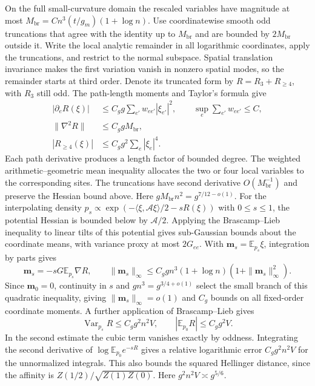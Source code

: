 \documentclass[11pt,a4paper]{article}
\numberwithin{equation}{section}
\begin{document}
On the full small-curvature domain the rescaled variables have magnitude at most \(M_{\mathrm{br}}=C n^3(t/g_m)(1+\log n)\). Use coordinatewise smooth odd truncations that agree with the identity up to \(M_{\mathrm{br}}\) and are bounded by \(2M_{\mathrm{br}}\) outside it. Write the local analytic remainder in all logarithmic coordinates, apply the truncations, and restrict to the normal subspace. Spatial translation invariance makes the first variation vanish in nonzero spatial modes, so the remainder starts at third order. Denote its truncated form by \(R=R_3+R_{\ge4}\), with \(R_3\) still odd. The path-length moments and Taylor's formula give
\begin{equation}
 \begin{split}
 |\partial_eR(\xi)|&\le C_g g\sum_{e'} w_{ee'}|\xi_{e'}|^2,
          \qquad \sup_e\sum_{e'}w_{ee'}\le C,\\
 \|\nabla^2 R\|&\le C_g gM_{\mathrm{br}},\\
 |R_{\ge4}(\xi)|&\le C_g g^2\sum_e|\xi_e|^4 .
 \end{split}                                                     \label{eq:cam-soft-remainder}
\end{equation}
Each path derivative produces a length factor of bounded degree. The weighted arithmetic--geometric mean inequality allocates the two or four local variables to the corresponding sites. The truncations have second derivative \(O(M_{\mathrm{br}}^{-1})\) and preserve the Hessian bound above. Here \(gM_{\mathrm{br}}n^2=g^{7/12-o(1)}\). For the interpolating density \(p_s\propto\exp(-\langle\xi,\mathcal A\xi\rangle/2-sR(\xi))\) with \(0\le s\le1\), the potential Hessian is bounded below by \(\mathcal A/2\). Applying the Brascamp--Lieb inequality to linear tilts of this potential gives sub-Gaussian bounds about the coordinate means, with variance proxy at most \(2G_{ee}\). With \(\mathbf m_s=\mathbb E_{p_s}\xi\), integration by parts gives
\[
 \mathbf m_s=-sG\mathbb E_{p_s}\nabla R,\qquad
 \|\mathbf m_s\|_\infty\le C_g gn^3(1+\log n)(1+\|\mathbf m_s\|_\infty^2).
\]
Since \(\mathbf m_0=0\), continuity in \(s\) and \(gn^3=g^{3/4+o(1)}\) select the small branch of this quadratic inequality, giving \(\|\mathbf m_s\|_\infty=o(1)\) and \(C_g\) bounds on all fixed-order coordinate moments. A further application of Brascamp--Lieb gives
\[
 \operatorname{Var}_{p_s}R\le C_g g^2n^2V,\qquad
 |\mathbb E_{p_0}R|\le C_g g^2V .
\]
In the second estimate the cubic term vanishes exactly by oddness. Integrating the second derivative of \(\log\mathbb E_{p_0}e^{-sR}\) gives a relative logarithmic error \(C_g g^2n^2V\) for the unnormalized integrals. This also bounds the squared Hellinger distance, since the affinity is \(Z(1/2)/\sqrt{Z(1)Z(0)}\). Here \(g^2n^2V\asymp g^{5/6}\).
\end{document}
